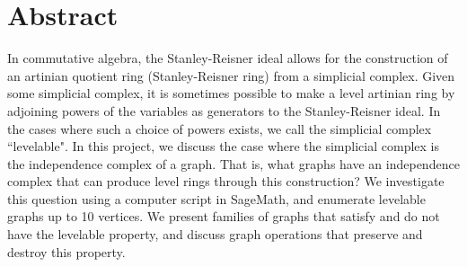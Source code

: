 


\begingroup
\let\clearpage\relax
\let\cleardoublepage\relax
\let\cleardoublepage\relax

\chapter*{Abstract}
In commutative algebra, the Stanley-Reisner ideal allows for the construction of an artinian quotient ring (Stanley-Reisner ring) from a simplicial complex. Given some simplicial complex, it is sometimes possible to make a level artinian ring by adjoining powers of the variables as generators to the Stanley-Reisner ideal. In the cases where such a choice of powers exists, we call the simplicial complex “levelable". In this project, we discuss the case where the simplicial complex is the independence complex of a graph. That is, what graphs have an independence complex that can produce level rings through this construction? We investigate this question using a computer script in SageMath, and enumerate levelable graphs up to 10 vertices. We present families of graphs that satisfy and do not have the levelable property, and discuss graph operations that preserve and destroy this property.

\endgroup			

\vfill